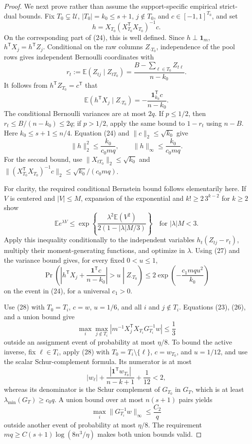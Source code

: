 \documentclass{article}
\begin{document}
\begin{proof}
We next prove rather than assume the support-specific empirical strict-dual bounds.  Fix \(T_0\subsetneq\mathcal U\), \(|T_0|=k_0\le s+1\), \(j\notin T_0\), and \(c\in[-1,1]^{T_0}\), and set
\[
 h=X_{T_0}(X_{T_0}^{\mathsf T}X_{T_0})^{-1}c. \tag{25}
\]
On the corresponding part of (24), this is well defined.  Since \(h\perp\mathbf1_m\), \(h^{\mathsf T}X_j=h^{\mathsf T}Z_j\).  Conditional on the raw columns \(Z_{\cdot T_0}\), independence of the pool rows gives independent Bernoulli coordinates with
\[
 r_t:=\mathbb E(Z_{tj}\mid Z_{tT_0})
 =\frac{B-\sum_{\ell\in T_0}Z_{t\ell}}{n-k_0}.
\]
It follows from \(h^{\mathsf T}Z_{T_0}=c^{\mathsf T}\) that
\[
 \mathbb E(h^{\mathsf T}X_j\mid Z_{\cdot T_0})
 =-\frac{\mathbf1_{k_0}^{\mathsf T}c}{n-k_0}. \tag{26}
\]
The conditional Bernoulli variances are at most \(2q\).  If \(p\le1/2\), then \(r_t\le B/(n-k_0)\le2q\); if \(p>1/2\), apply the same bound to \(1-r_t\) using \(n-B\).  Here \(k_0\le s+1\le n/4\).  Equation (24) and \(\lVert c\rVert_2\le\sqrt{k_0}\) give
\[
 \lVert h\rVert_2^2\le\frac{k_0}{c_0mq},
 \qquad
 \lVert h\rVert_\infty\le\frac{k_0}{c_0mq}. \tag{27}
\]
For the second bound, use \(\lVert X_{tT_0}\rVert_2\le\sqrt{k_0}\) and
\(\lVert(X_{T_0}^{\mathsf T}X_{T_0})^{-1}c\rVert_2\le\sqrt{k_0}/(c_0mq)\).

For clarity, the required conditional Bernstein bound follows elementarily here.  If \(V\) is centered and \(|V|\le M\), expansion of the exponential and \(k!\ge2\,3^{k-2}\) for \(k\ge2\) show
\[
 \mathbb E e^{\lambda V}
 \le\exp\!\left\{\frac{\lambda^2\mathbb E(V^2)}{2(1-|\lambda|M/3)}\right\}
 \quad\text{for }|\lambda|M<3.
\]
Apply this inequality conditionally to the independent variables
\(h_t(Z_{tj}-r_t)\), multiply their moment-generating functions, and optimize in \(\lambda\).  Using (27) and the variance bound gives, for every fixed \(0<u\le1\),
\[
 \Pr\!\left(
  \left|h^{\mathsf T}X_j+\frac{\mathbf1^{\mathsf T}c}{n-k_0}\right|>u
  \middle|Z_{\cdot T_0}\right)
 \le2\exp\!\left(-\frac{c_1mqu^2}{k_0}\right) \tag{28}
\]
on the event in (24), for a universal \(c_1>0\).

Use (28) with \(T_0=T_i\), \(c=w\), \(u=1/6\), and all \(i\) and \(j\notin T_i\).  Equations (23), (26), and a union bound give
\[
 \max_i\max_{j\notin T_i}
 \left|m^{-1}X_j^{\mathsf T}X_{T_i}G_{T_i}^{-1}w\right|
 \le\frac13 \tag{29}
\]
outside an assignment event of probability at most \(\eta/8\).  To bound the active inverse, fix \(\ell\in T_i\), apply (28) with \(T_0=T_i\setminus\{\ell\}\), \(c=w_{T_0}\), and \(u=1/12\), and use the scalar Schur-complement formula.  Its numerator is at most
\[
 |w_\ell|+\frac{|\mathbf1^{\mathsf T}w_{T_0}|}{n-k+1}+\frac1{12}<2,
\]
whereas its denominator is the Schur complement of \(G_{T_0}\) in \(G_T\), which is at least \(\lambda_{\min}(G_T)\ge c_0q\).  A union bound over at most \(n(s+1)\) pairs yields
\[
 \max_i\lVert G_{T_i}^{-1}w\rVert_\infty\le\frac{C_2}{q} \tag{30}
\]
outside another event of probability at most \(\eta/8\).  The requirement
\(mq\ge C(s+1)\log(8n^3/\eta)\) makes both union bounds valid.


\end{proof}
\end{document}
